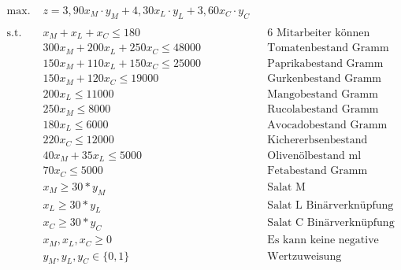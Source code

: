 \documentclass[a4paper,11pt]{article}
\begin{document}
\begin{align*}
    \text{max. } & z = 3,90x_{M} \cdot y_{M} + 4,30x_{L} \cdot y_{L} + 3,60x_{C} \cdot y_{C} \\
    \\
    \text{s.t. } & x_{M} + x_{L} + x_{C} \le 180 && \text{6 Mitarbeiter können täglich 30 Salate anrichten} \\
    & 300x_{M} + 200x_{L} + 250x_{C} \le 48000 && \text{Tomatenbestand Gramm} \\
    & 150x_{M} + 110x_{L} + 150x_{C} \le 25000 && \text{Paprikabestand Gramm} \\
    & 150x_{M} + 120x_{C} \le 19000 && \text{Gurkenbestand Gramm} \\
    & 200x_{L} \le 11000 && \text{Mangobestand Gramm} \\
    & 250x_{M} \le 8000 && \text{Rucolabestand Gramm} \\
    & 180x_{L} \le 6000 && \text{Avocadobestand Gramm} \\
    & 220x_{C} \le 12000 && \text{Kichererbsenbestand Gramm} \\
    & 40x_{M} + 35x_{L} \le 5000 && \text{Olivenölbestand ml} \\
    & 70x_{C} \le 5000 && \text{Fetabestand Gramm} \\
    & x_{M} \ge 30*y_{M} && \text{Salat M Binärverknüpfung} \\
    & x_{L} \ge 30*y_{L} && \text{Salat L Binärverknüpfung} \\
    & x_{C} \ge 30*y_{C} && \text{Salat C Binärverknüpfung} \\
    & x_{M}, x_{L}, x_{C} \ge 0 && \text{Es kann keine negative Menge angerichtet werden} \\
    & y_{M}, y_{L}, y_{C} \in \{ 0,1 \} && \text{Wertzuweisung Binärvariablen} \\
\end{align*}
\end{document}

